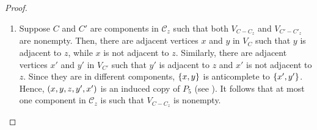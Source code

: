 \begin{proof}
\begin{enumerate}[label=(\roman*)]
            \begin{figure}[htb!]
                \centering
                \caption{An induced copy of $P_5$ given that both $N_{a}\cup
                    N_{b}$ and $\bigcup_{C\in\mathcal{C}_z} V_{C-C_z}$ are
                    nonempty.}
                \label{fig:additional_3}
            \end{figure}

        \item Suppose $C$ and $C'$ are components in $\mathcal{C}_z$ such that
            both $V_{C-C_z}$ and $V_{C'-C'_z}$ are nonempty. Then, there are
            adjacent vertices $x$ and $y$ in $V_{C}$ such that $y$ is adjacent
            to $z$, while $x$ is not adjacent to $z$. Similarly, there are
            adjacent vertices $x'$ and $y'$ in $V_{C'}$ such that $y'$ is
            adjacent to $z$ and $x'$ is not adjacent to $z$. Since they are in
            different components, $\left\{x,y\right\}$ is anticomplete to $\left\{x',y'\right\}$.
            Hence, $\left(x,y,z,y',x'\right)$ is an induced copy of $P_5$ (see
            ). It follows that at most one component in
            $\mathcal{C}_z$ is such that $V_{C-C_z}$ is nonempty.


\end{enumerate}
\end{proof}
